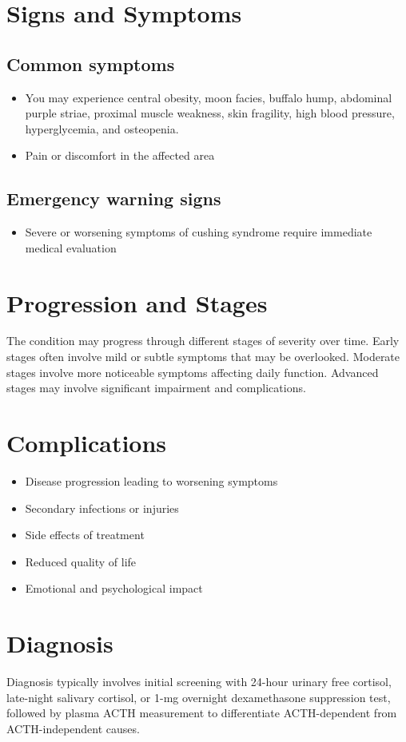 \section{Signs and Symptoms}

\subsection{Common symptoms}
\begin{itemize}[noitemsep]
  \item You may experience central obesity, moon facies, buffalo hump, abdominal purple striae, proximal muscle weakness, skin fragility, high blood pressure, hyperglycemia, and osteopenia.

  \item Pain or discomfort in the affected area
  \end{itemize}

\subsection{Emergency warning signs}
\begin{itemize}[noitemsep]
  \item Severe or worsening symptoms of cushing syndrome require immediate medical evaluation
\end{itemize}
\section{Progression and Stages}
The condition may progress through different stages of severity over time. Early stages often involve mild or subtle symptoms that may be overlooked. Moderate stages involve more noticeable symptoms affecting daily function. Advanced stages may involve significant impairment and complications.
\section{Complications}
\begin{itemize}[noitemsep]
  \item Disease progression leading to worsening symptoms
  \item Secondary infections or injuries
  \item Side effects of treatment
  \item Reduced quality of life
  \item Emotional and psychological impact
\end{itemize}
\section{Diagnosis}
Diagnosis typically involves initial screening with 24-hour urinary free cortisol, late-night salivary cortisol, or 1-mg overnight dexamethasone suppression test, followed by plasma ACTH measurement to differentiate ACTH-dependent from ACTH-independent causes.


